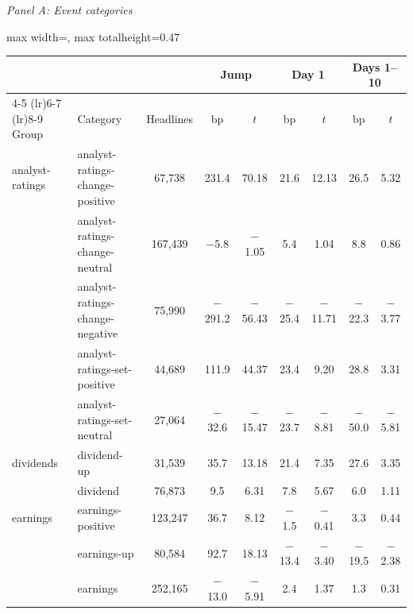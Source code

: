 \begin{table}[htbp]
{\footnotesize
\textit{Panel A: Event categories}\\[2pt]
\begin{adjustbox}{max width=\linewidth, max totalheight=0.47\textheight}
\begin{tabular}{llccccccc}
\toprule
\multicolumn{3}{c}{} & \multicolumn{2}{c}{Jump} & \multicolumn{2}{c}{Day 1} & \multicolumn{2}{c}{Days 1--10} \\
\cmidrule(lr){4-5} \cmidrule(lr){6-7} \cmidrule(lr){8-9}
Group & Category & Headlines & bp & $t$ & bp & $t$ & bp & $t$ \\
\midrule
analyst-ratings & analyst-ratings-change-positive & \phantom{0}67,738 & \phantom{$-$}231.4 & \phantom{$-$}70.18 & \phantom{$-$}21.6 & \phantom{$-$}12.13 & \phantom{$-$}26.5 & \phantom{$-$}5.32 \\
 & analyst-ratings-change-neutral & 167,439 & \phantom{00}$-$5.8 & \phantom{0}$-$1.05 & \phantom{$-$0}5.4 & \phantom{$-$0}1.04 & \phantom{$-$0}8.8 & \phantom{$-$}0.86 \\
 & analyst-ratings-change-negative & \phantom{0}75,990 & $-$291.2 & $-$56.43 & $-$25.4 & $-$11.71 & $-$22.3 & $-$3.77 \\
 & analyst-ratings-set-positive & \phantom{0}44,689 & \phantom{$-$}111.9 & \phantom{$-$}44.37 & \phantom{$-$}23.4 & \phantom{$-$0}9.20 & \phantom{$-$}28.8 & \phantom{$-$}3.31 \\
 & analyst-ratings-set-neutral & \phantom{0}27,064 & \phantom{0}$-$32.6 & $-$15.47 & $-$23.7 & \phantom{0}$-$8.81 & $-$50.0 & $-$5.81 \\
\midrule
dividends & dividend-up & \phantom{0}31,539 & \phantom{$-$0}35.7 & \phantom{$-$}13.18 & \phantom{$-$}21.4 & \phantom{$-$0}7.35 & \phantom{$-$}27.6 & \phantom{$-$}3.35 \\
 & dividend & \phantom{0}76,873 & \phantom{$-$00}9.5 & \phantom{$-$0}6.31 & \phantom{$-$0}7.8 & \phantom{$-$0}5.67 & \phantom{$-$0}6.0 & \phantom{$-$}1.11 \\
\midrule
earnings & earnings-positive & 123,247 & \phantom{$-$0}36.7 & \phantom{$-$0}8.12 & \phantom{0}$-$1.5 & \phantom{0}$-$0.41 & \phantom{$-$0}3.3 & \phantom{$-$}0.44 \\
 & earnings-up & \phantom{0}80,584 & \phantom{$-$0}92.7 & \phantom{$-$}18.13 & $-$13.4 & \phantom{0}$-$3.40 & $-$19.5 & $-$2.38 \\
 & earnings & 252,165 & \phantom{0}$-$13.0 & \phantom{0}$-$5.91 & \phantom{$-$0}2.4 & \phantom{$-$0}1.37 & \phantom{$-$0}1.3 & \phantom{$-$}0.31 \\

\end{tabular}
\end{adjustbox}}
\end{table}
